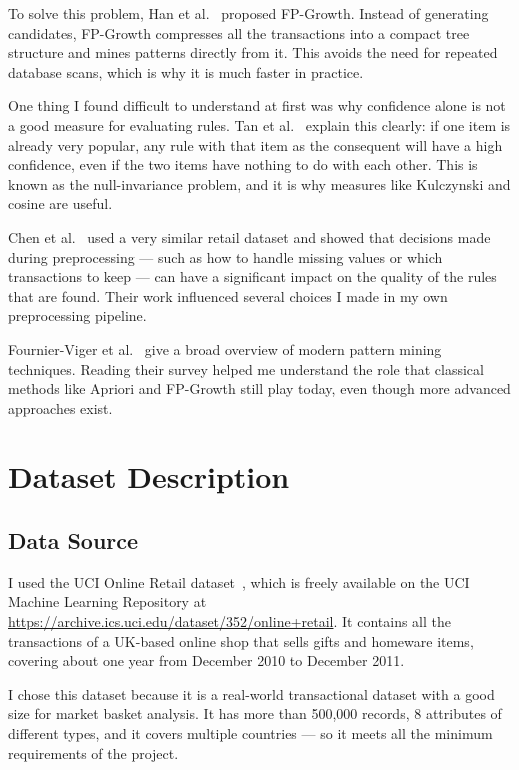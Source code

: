 \documentclass[conference]{IEEEtran}
\begin{document}
To solve this problem, Han et al.~\cite{b2} proposed FP-Growth. Instead of generating candidates, FP-Growth compresses all the transactions into a compact tree structure and mines patterns directly from it. This avoids the need for repeated database scans, which is why it is much faster in practice.

One thing I found difficult to understand at first was why confidence alone is not a good measure for evaluating rules. Tan et al.~\cite{b3} explain this clearly: if one item is already very popular, any rule with that item as the consequent will have a high confidence, even if the two items have nothing to do with each other. This is known as the null-invariance problem, and it is why measures like Kulczynski and cosine are useful.

Chen et al.~\cite{b4} used a very similar retail dataset and showed that decisions made during preprocessing — such as how to handle missing values or which transactions to keep — can have a significant impact on the quality of the rules that are found. Their work influenced several choices I made in my own preprocessing pipeline.

Fournier-Viger et al.~\cite{b5} give a broad overview of modern pattern mining techniques. Reading their survey helped me understand the role that classical methods like Apriori and FP-Growth still play today, even though more advanced approaches exist.

\section{Dataset Description}
\label{sec:dataset}

\subsection{Data Source}

I used the UCI Online Retail dataset~\cite{b4}, which is freely available on the UCI Machine Learning Repository at \url{https://archive.ics.uci.edu/dataset/352/online+retail}. It contains all the transactions of a UK-based online shop that sells gifts and homeware items, covering about one year from December 2010 to December 2011.

I chose this dataset because it is a real-world transactional dataset with a good size for market basket analysis. It has more than 500,000 records, 8 attributes of different types, and it covers multiple countries — so it meets all the minimum requirements of the project.
\end{document}
